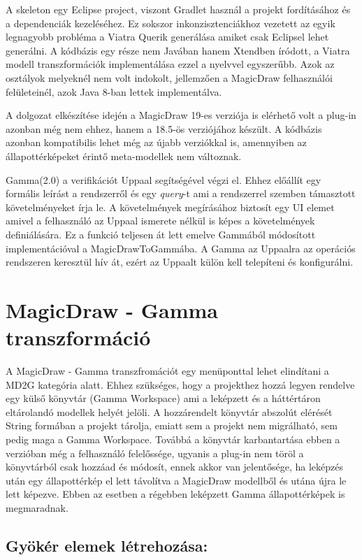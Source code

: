 A skeleton egy Eclipse project, viszont Gradlet használ a projekt fordításához és a dependenciák kezeléséhez. Ez sokszor inkonzisztenciákhoz vezetett az egyik legnagyobb probléma a Viatra Querik generálása amiket csak Eclipsel lehet generálni. A kódbázis egy része nem Javában hanem Xtendben íródott, a Viatra modell transzformációk implementálása ezzel a nyelvvel egyszerűbb. Azok az osztályok melyeknél nem volt indokolt, jellemzően a MagicDraw felhasználói felületeinél, azok Java 8-ban lettek implementálva.

A dolgozat elkészítése idején a MagicDraw 19-es verziója is elérhető volt a plug-in azonban még nem ehhez, hanem a 18.5-ös verziójához készült. A kódbázis azonban kompatibilis lehet még az újabb verziókkal is, amennyiben az állapottérképeket érintő meta-modellek nem változnak.

Gamma(2.0) a verifikációt Uppaal segítségével végzi el. Ehhez előállít egy formális leírást a rendszerről és egy \emph{query}-t ami a rendszerrel szemben támasztott követelményeket írja le. A követelmények megírásához biztosít egy UI elemet amivel a felhasználó az Uppaal ismerete nélkül is képes a követelmények definiálására. Ez a funkció teljesen át lett emelve Gammából módosított implementációval a MagicDrawToGammába. A Gamma az Uppaalra az operációs rendszeren keresztül hív át, ezért az Uppaalt külön kell telepíteni és konfigurálni.

\section{MagicDraw - Gamma transzformáció}

A MagicDraw - Gamma transzfromációt egy menüponttal lehet elindítani a MD2G kategória alatt. Ehhez szükséges, hogy a projekthez hozzá legyen rendelve egy külső könyvtár (Gamma Workspace) ami a leképzett és a háttértáron eltárolandó modellek helyét jelöli. A hozzárendelt könyvtár abszolút elérését String formában a projekt tárolja, emiatt sem a projekt nem migrálható, sem pedig maga a Gamma Workspace. Továbbá a könyvtár karbantartása ebben a verzióban még a felhasználó felelőssége, ugyanis a plug-in nem töröl a könyvtárból csak hozzáad és módosít, ennek akkor van jelentősége, ha leképzés után egy állapottérkép el lett távolítva a MagicDraw modellből és utána újra le lett képezve. Ebben az esetben a régebben leképzett Gamma állapottérképek is megmaradnak.

\subsection{Gyökér elemek létrehozása:}


